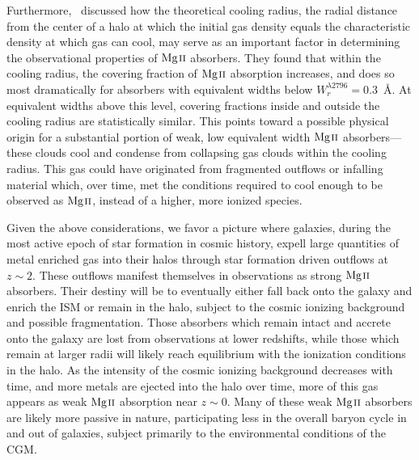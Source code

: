Furthermore,~\cite{MAGIICAT3} discussed how the theoretical cooling radius, the radial distance from the center of a halo at which the initial gas density equals the characteristic density at which gas can cool, may serve as an important factor in determining the observational properties of ${\hbox{{\rm Mg}\kern 0.1em{\sc ii}}}$ absorbers. They found that within the cooling radius, the covering fraction of ${\hbox{{\rm Mg}\kern 0.1em{\sc ii}}}$ absorption increases, and does so most dramatically for absorbers with equivalent widths below $W_r^{\lambda2796} = 0.3$~{\AA}. At equivalent widths above this level, covering fractions inside and outside the cooling radius are statistically similar. This points toward a possible physical origin for a substantial portion of weak, low equivalent width ${\hbox{{\rm Mg}\kern 0.1em{\sc ii}}}$ absorbers---these clouds cool and condense from collapsing gas clouds within the cooling radius. This gas could have originated from fragmented outflows or infalling material which, over time, met the conditions required to cool enough to be observed as ${\hbox{{\rm Mg}\kern 0.1em{\sc ii}}}$, instead of a higher, more ionized species.

Given the above considerations, we favor a picture where galaxies, during the most active epoch of star formation in cosmic history, expell large quantities of metal enriched gas into their halos through star formation driven outflows at $z \sim 2$. These outflows manifest themselves in observations as strong ${\hbox{{\rm Mg}\kern 0.1em{\sc ii}}}$ absorbers. Their destiny will be to eventually either fall back onto the galaxy and enrich the ISM or remain in the halo, subject to the cosmic ionizing background and possible fragmentation. Those absorbers which remain intact and accrete onto the galaxy are lost from observations at lower redshifts, while those which remain at larger radii will likely reach equilibrium with the ionization conditions in the halo. As the intensity of the cosmic ionizing background decreases with time, and more metals are ejected into the halo over time, more of this gas appears as weak ${\hbox{{\rm Mg}\kern 0.1em{\sc ii}}}$ absorption near $z \sim 0$. Many of these weak ${\hbox{{\rm Mg}\kern 0.1em{\sc ii}}}$ absorbers are likely more passive in nature, participating less in the overall baryon cycle in and out of galaxies, subject primarily to the environmental conditions of the CGM.
